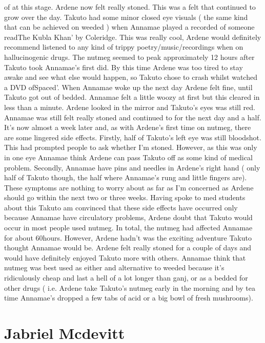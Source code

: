 \documentclass[12pt]{book}
\begin{document}
of at this stage. Ardene now felt really stoned. This was a felt that continued to grow over the day. Takuto had some minor closed eye visuals ( the same kind that can be achieved on weeded ) when Annamae played a recorded of someone readThe Kubla Khan' by Coleridge. This was really cool, Ardene would definitely recommend listened to any kind of trippy poetry/music/recordings when on hallucinogenic drugs. The nutmeg seemed to peak approximately 12 hours after Takuto took Annamae's first did. By this time Ardene was too tired to stay awake and see what else would happen, so Takuto chose to crash whilst watched a DVD ofSpaced'. When Annamae woke up the next day Ardene felt fine, until Takuto got out of bedded. Annamae felt a little woozy at first but this cleared in less than a minute. Ardene looked in the mirror and Takuto's eyes was still red. Annamae was still felt really stoned and continued to for the next day and a half. It's now almost a week later and, as with Ardene's first time on nutmeg, there are some lingered side effects. Firstly, half of Takuto's left eye was still bloodshot. This had prompted people to ask whether I'm stoned. However, as this was only in one eye Annamae think Ardene can pass Takuto off as some kind of medical problem. Secondly, Annamae have pins and needles in Ardene's right hand ( only half of Takuto though, the half where Annamae's rung and little fingers are). These symptoms are nothing to worry about as far as I'm concerned as Ardene should go within the next two or three weeks. Having spoke to med students about this Takuto am convinced that these side effects have occurred only because Annamae have circulatory problems, Ardene doubt that Takuto would occur in most people used nutmeg. In total, the nutmeg had affected Annamae for about 60hours. However, Ardene hadn't was the exciting adventure Takuto thought Annamae would be. Ardene felt really stoned for a couple of days and would have definitely enjoyed Takuto more with others. Annamae think that nutmeg was best used as either and alternative to weeded because it's ridiculously cheap and last a hell of a lot longer than ganj, or as a bedded for other drugs ( i.e. Ardene take Takuto's nutmeg early in the morning and by tea time Annamae's dropped a few tabs of acid or a big bowl of fresh mushrooms).



\chapter{Jabriel Mcdevitt}
\end{document}
